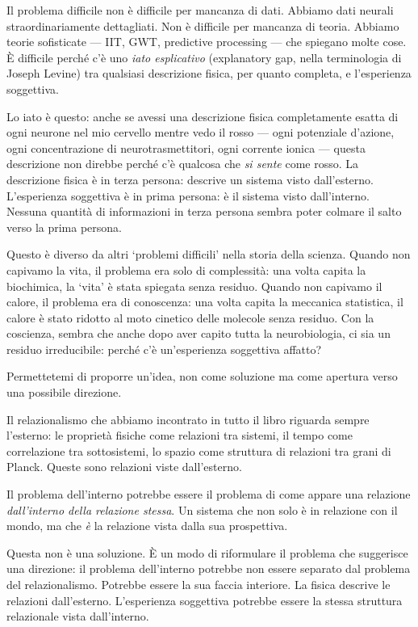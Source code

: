 \documentclass[12pt,a4paper,openany]{book}
\newcommand{\sezione}[1]{\vspace{1.2em}{\large\bfseries #1}\vspace{0.5em}\par}
\begin{document}
Il problema difficile non è difficile per mancanza di dati. Abbiamo dati neurali straordinariamente dettagliati. Non è difficile per mancanza di teoria. Abbiamo teorie sofisticate --- IIT, GWT, predictive processing --- che spiegano molte cose. È difficile perché c'è uno \textit{iato esplicativo} (explanatory gap, nella terminologia di Joseph Levine) tra qualsiasi descrizione fisica, per quanto completa, e l'esperienza soggettiva.

Lo iato è questo: anche se avessi una descrizione fisica completamente esatta di ogni neurone nel mio cervello mentre vedo il rosso --- ogni potenziale d'azione, ogni concentrazione di neurotrasmettitori, ogni corrente ionica --- questa descrizione non direbbe perché c'è qualcosa che \textit{si sente} come rosso. La descrizione fisica è in terza persona: descrive un sistema visto dall'esterno. L'esperienza soggettiva è in prima persona: è il sistema visto dall'interno. Nessuna quantità di informazioni in terza persona sembra poter colmare il salto verso la prima persona.

Questo è diverso da altri `problemi difficili' nella storia della scienza. Quando non capivamo la vita, il problema era solo di complessità: una volta capita la biochimica, la `vita' è stata spiegata senza residuo. Quando non capivamo il calore, il problema era di conoscenza: una volta capita la meccanica statistica, il calore è stato ridotto al moto cinetico delle molecole senza residuo. Con la coscienza, sembra che anche dopo aver capito tutta la neurobiologia, ci sia un residuo irreducibile: perché c'è un'esperienza soggettiva affatto?

\sezione{Un'ipotesi strutturale}

Permettetemi di proporre un'idea, non come soluzione ma come apertura verso una possibile direzione.

Il relazionalismo che abbiamo incontrato in tutto il libro riguarda sempre l'esterno: le proprietà fisiche come relazioni tra sistemi, il tempo come correlazione tra sottosistemi, lo spazio come struttura di relazioni tra grani di Planck. Queste sono relazioni viste dall'esterno.

Il problema dell'interno potrebbe essere il problema di come appare una relazione \textit{dall'interno della relazione stessa}. Un sistema che non solo è in relazione con il mondo, ma che \textit{è} la relazione vista dalla sua prospettiva.

Questa non è una soluzione. È un modo di riformulare il problema che suggerisce una direzione: il problema dell'interno potrebbe non essere separato dal problema del relazionalismo. Potrebbe essere la sua faccia interiore. La fisica descrive le relazioni dall'esterno. L'esperienza soggettiva potrebbe essere la stessa struttura relazionale vista dall'interno.
\end{document}
